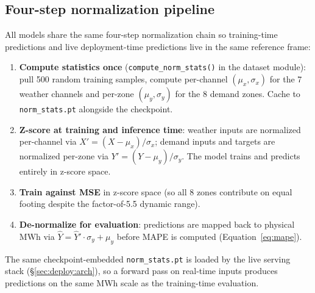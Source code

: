 \subsection{Four-step normalization pipeline}
\label{sec:data:norm}

All models share the same four-step normalization chain so training-time predictions and live deployment-time predictions live in the same reference frame:

\begin{enumerate}\setlength\itemsep{1pt}
  \item \textbf{Compute statistics once} (\texttt{compute\_norm\_stats()} in the dataset module): pull 500 random training samples, compute per-channel $(\mu_x, \sigma_x)$ for the 7 weather channels and per-zone $(\mu_y, \sigma_y)$ for the 8 demand zones. Cache to \texttt{norm\_stats.pt} alongside the checkpoint.
  \item \textbf{Z-score at training and inference time}: weather inputs are normalized per-channel via $X' = (X - \mu_x) / \sigma_x$; demand inputs and targets are normalized per-zone via $Y' = (Y - \mu_y) / \sigma_y$. The model trains and predicts entirely in z-score space.
  \item \textbf{Train against MSE} in z-score space (so all 8 zones contribute on equal footing despite the factor-of-5.5 dynamic range).
  \item \textbf{De-normalize for evaluation}: predictions are mapped back to physical MWh via $\hat Y = \hat Y' \cdot \sigma_y + \mu_y$ before MAPE is computed (Equation~\ref{eq:mape}).
\end{enumerate}

The same checkpoint-embedded \texttt{norm\_stats.pt} is loaded by the live serving stack (\S\ref{sec:deploy:arch}), so a forward pass on real-time inputs produces predictions on the same MWh scale as the training-time evaluation.
